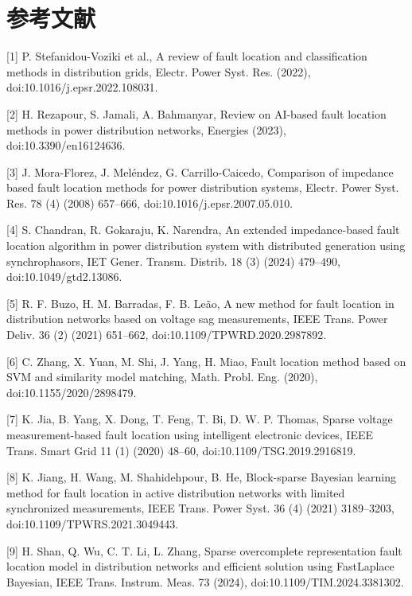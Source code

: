 \documentclass[
  11pt,
]{ctexart}
\begin{document}
\hypertarget{ux53c2ux8003ux6587ux732e}{%
\section{参考文献}\label{ux53c2ux8003ux6587ux732e}}

{[}1{]} P. Stefanidou-Voziki et al., A review of fault location and
classification methods in distribution grids, Electr. Power Syst. Res.
(2022), doi:10.1016/j.epsr.2022.108031.

{[}2{]} H. Rezapour, S. Jamali, A. Bahmanyar, Review on AI-based fault
location methods in power distribution networks, Energies (2023),
doi:10.3390/en16124636.

{[}3{]} J. Mora-Florez, J. Meléndez, G. Carrillo-Caicedo, Comparison of
impedance based fault location methods for power distribution systems,
Electr. Power Syst. Res. 78 (4) (2008) 657--666,
doi:10.1016/j.epsr.2007.05.010.

{[}4{]} S. Chandran, R. Gokaraju, K. Narendra, An extended
impedance-based fault location algorithm in power distribution system
with distributed generation using synchrophasors, IET Gener. Transm.
Distrib. 18 (3) (2024) 479--490, doi:10.1049/gtd2.13086.

{[}5{]} R. F. Buzo, H. M. Barradas, F. B. Leão, A new method for fault
location in distribution networks based on voltage sag measurements,
IEEE Trans. Power Deliv. 36 (2) (2021) 651--662,
doi:10.1109/TPWRD.2020.2987892.

{[}6{]} C. Zhang, X. Yuan, M. Shi, J. Yang, H. Miao, Fault location
method based on SVM and similarity model matching, Math. Probl. Eng.
(2020), doi:10.1155/2020/2898479.

{[}7{]} K. Jia, B. Yang, X. Dong, T. Feng, T. Bi, D. W. P. Thomas,
Sparse voltage measurement-based fault location using intelligent
electronic devices, IEEE Trans. Smart Grid 11 (1) (2020) 48--60,
doi:10.1109/TSG.2019.2916819.

{[}8{]} K. Jiang, H. Wang, M. Shahidehpour, B. He, Block-sparse Bayesian
learning method for fault location in active distribution networks with
limited synchronized measurements, IEEE Trans. Power Syst. 36 (4) (2021)
3189--3203, doi:10.1109/TPWRS.2021.3049443.

{[}9{]} H. Shan, Q. Wu, C. T. Li, L. Zhang, Sparse overcomplete
representation fault location model in distribution networks and
efficient solution using FastLaplace Bayesian, IEEE Trans. Instrum.
Meas. 73 (2024), doi:10.1109/TIM.2024.3381302.
\end{document}
